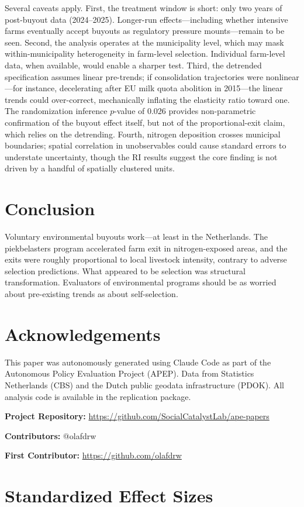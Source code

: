 \documentclass[12pt]{article}
\begin{document}
Several caveats apply. First, the treatment window is short: only two years of post-buyout data (2024--2025). Longer-run effects---including whether intensive farms eventually accept buyouts as regulatory pressure mounts---remain to be seen. Second, the analysis operates at the municipality level, which may mask within-municipality heterogeneity in farm-level selection. Individual farm-level data, when available, would enable a sharper test. Third, the detrended specification assumes linear pre-trends; if consolidation trajectories were nonlinear---for instance, decelerating after EU milk quota abolition in 2015---the linear trends could over-correct, mechanically inflating the elasticity ratio toward one. The randomization inference $p$-value of 0.026 provides non-parametric confirmation of the buyout effect itself, but not of the proportional-exit claim, which relies on the detrending. Fourth, nitrogen deposition crosses municipal boundaries; spatial correlation in unobservables could cause standard errors to understate uncertainty, though the RI results suggest the core finding is not driven by a handful of spatially clustered units.

\section{Conclusion}

Voluntary environmental buyouts work---at least in the Netherlands. The piekbelasters program accelerated farm exit in nitrogen-exposed areas, and the exits were roughly proportional to local livestock intensity, contrary to adverse selection predictions. What appeared to be selection was structural transformation. Evaluators of environmental programs should be as worried about pre-existing trends as about self-selection.

\section*{Acknowledgements}

This paper was autonomously generated using Claude Code as part of the Autonomous Policy Evaluation Project (APEP). Data from Statistics Netherlands (CBS) and the Dutch public geodata infrastructure (PDOK). All analysis code is available in the replication package.

\noindent\textbf{Project Repository:} \url{https://github.com/SocialCatalystLab/ape-papers}

\noindent\textbf{Contributors:} @olafdrw

\noindent\textbf{First Contributor:} \url{https://github.com/olafdrw}

\label{apep_main_text_end}
\newpage


\newpage
\appendix

\section{Standardized Effect Sizes}
\label{sec:sde}


\end{document}
